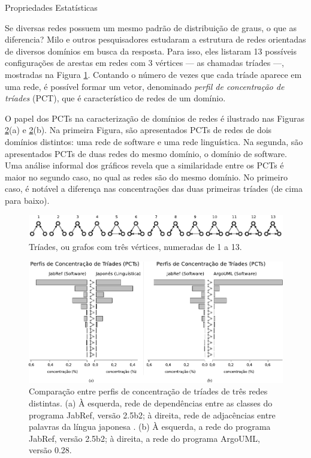\begin{section}{Propriedades Estatísticas}

Se diversas redes possuem um mesmo padrão de distribuição de graus, o que as diferencia? Milo e outros pesquisadores \cite{Milo2002} estudaram a estrutura de redes orientadas de diversos domínios em busca da resposta. Para isso, eles listaram 13 possíveis configurações de arestas em redes com 3 vértices --- as chamadas tríades ---, mostradas na Figura \ref{fig:triades}. Contando o número de vezes que cada tríade aparece em uma rede, é possível formar um vetor, denominado \emph{perfil de concentração de tríades} (PCT), que é característico de redes de um domínio. 

O papel dos PCTs na caracterização de domínios de redes é ilustrado nas Figuras \ref{fig:tcp}(a) e \ref{fig:tcp}(b). Na primeira Figura, são apresentados PCTs de redes de dois domínios distintos: uma rede de software e uma rede linguística. Na segunda, são apresentados PCTs de duas redes do mesmo domínio, o domínio de software. Uma análise informal dos gráficos revela que a similaridade entre os PCTs é maior no segundo caso, no qual as redes são do mesmo domínio. No primeiro caso, é notável a diferença nas concentrações das duas primeiras tríades (de cima para baixo). 
% 

\begin{figure}[htbp]
	\centering
		\includegraphics[scale=1]{figuras/triads}
	\caption{Tríades, ou grafos com três vértices, numeradas de 1 a 13.}
	\label{fig:triades}
\end{figure}

\begin{figure}[htbp]
	\centering
		\includegraphics[width=1\textwidth]{figuras/tcp}
	\caption{Comparação entre perfis de concentração de tríades de três redes distintas. (a) À esquerda, rede de dependências entre as classes do programa JabRef, versão 2.5b2; à direita, rede de adjacências entre palavras da língua japonesa \cite{Milo2004}. (b) À esquerda, a rede do programa JabRef, versão 2.5b2; à direita, a rede do programa ArgoUML, versão 0.28.}
	\label{fig:tcp}
\end{figure}


\end{section}
